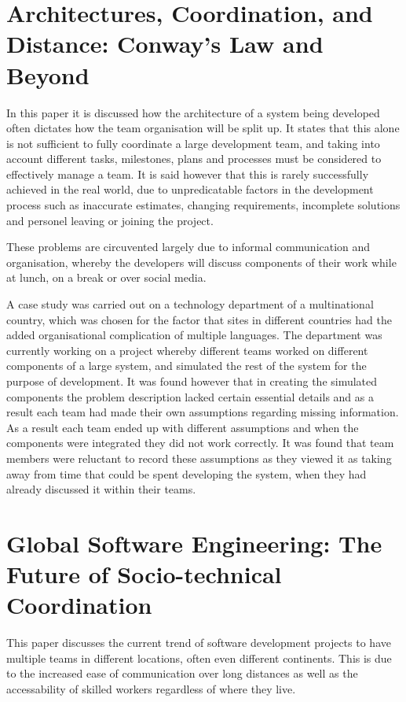 \documentclass{l4proj}
\begin{document}
\section{Architectures, Coordination, and Distance: Conway's Law and Beyond}

In this paper it is discussed how the architecture of a system being developed often dictates how the team organisation will be split up.  It states that this alone is not sufficient to fully coordinate a large development team, and taking into account different tasks, milestones, plans and processes must be considered to effectively manage a team.  It is said however that this is rarely successfully achieved in the real world, due to unpredicatable factors in the development process such as inaccurate estimates, changing requirements, incomplete solutions and personel leaving or joining the project.  

These problems are circuvented largely due to informal communication and organisation, whereby the developers will discuss components of their work while at lunch, on a break or over social media.

A case study was carried out on a technology department of a multinational country, which was chosen for the factor that sites in different countries had the added organisational complication of multiple languages.  The department was currently working on a project whereby different teams worked on different components of a large system, and simulated the rest of the system for the purpose of development.  It was found however that in creating the simulated components the problem description lacked certain essential details and as a result each team had made their own assumptions regarding missing information.  As a result each team ended up with different assumptions and when the components were integrated they did not work correctly.  It was found that team members were reluctant to record these assumptions as they viewed it as taking away from time that could be spent developing the system, when they had already discussed it within their teams.

\section{Global Software Engineering: The Future of Socio-technical Coordination}

This paper discusses the current trend of software development projects to have multiple teams in different locations, often even different continents.  This is due to the increased ease of communication over long distances as well as the accessability of skilled workers regardless of where they live.
\end{document}
